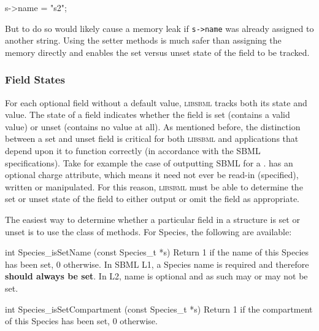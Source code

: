 \documentclass{cekmanual}
\newcommand{\libsbml}{\textsc{libsbml}}
\begin{document}
\begin{example}[c]
s->name = "s2";
\end{example}

But to do so would likely cause a memory leak if \texttt{s->name} was
already assigned to another string.  Using the setter methods is much
safer than assigning the memory directly and enables the set versus
unset state of the field to be tracked.


\subsubsection{Field States}
\label{sec:field-states}

For each optional field without a default value, \textsc{libsbml}
tracks both its state and value.  The state of a field indicates
whether the field is set (contains a valid value) or unset (contains
no value at all).  As mentioned before, the distinction between a set
and unset field is critical for both \textsc{libsbml} and applications
that depend upon it to function correctly (in accordance with the SBML
specifications).  Take for example the case of outputting SBML for a
.   has an optional charge attribute,
which means it need not ever be read-in (specified), written or
manipulated.  For this reason, \libsbml{} must be able to
determine the set or unset state of the  field to
either output or omit the field as appropriate.

The easiest way to determine whether a particular field in a structure is
set or unset is to use the  class of methods.  For
Species, the following are available:


\begin{methoddef}{int Species\_isSetName (const Species\_t *s)}
  Return 1 if the name of this Species has been set, 0 otherwise.  In
  SBML L1, a Species name is required and therefore \textbf{should
  always be set}.  In L2, name is optional and as such may or may not
  be set.
\end{methoddef}

\begin{methoddef}{int Species\_isSetCompartment (const Species\_t *s)}
  Return 1 if the compartment of this Species has been set, 0 otherwise.
\end{methoddef}
\end{document}
